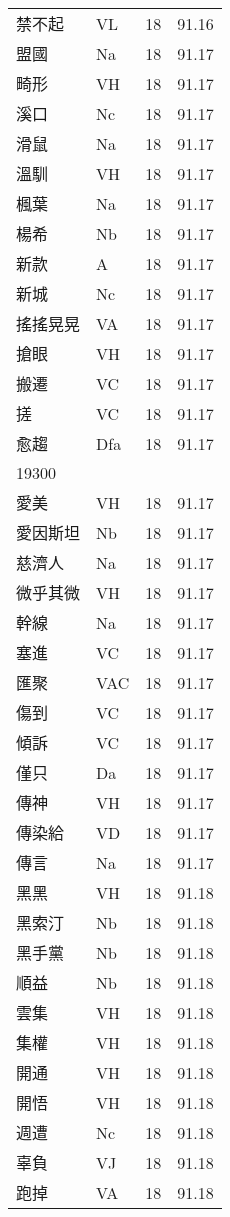 \documentclass[twocolumn]{book}
\begin{document}
\begin{supertabular}{llrr}
禁不起 & VL & 18 &  91.16\\
盟國 & Na & 18 &  91.17\\
畸形 & VH & 18 &  91.17\\
溪口 & Nc & 18 &  91.17\\
滑鼠 & Na & 18 &  91.17\\
溫馴 & VH & 18 &  91.17\\
楓葉 & Na & 18 &  91.17\\
楊希 & Nb & 18 &  91.17\\
新款 & A & 18 &  91.17\\
新城 & Nc & 18 &  91.17\\
搖搖晃晃 & VA & 18 &  91.17\\
搶眼 & VH & 18 &  91.17\\
搬遷 & VC & 18 &  91.17\\
搓 & VC & 18 &  91.17\\
愈趨 & Dfa & 18 &  91.17\\
19300\\
愛美 & VH & 18 &  91.17\\
愛因斯坦 & Nb & 18 &  91.17\\
慈濟人 & Na & 18 &  91.17\\
微乎其微 & VH & 18 &  91.17\\
幹線 & Na & 18 &  91.17\\
塞進 & VC & 18 &  91.17\\
匯聚 & VAC & 18 &  91.17\\
傷到 & VC & 18 &  91.17\\
傾訴 & VC & 18 &  91.17\\
僅只 & Da & 18 &  91.17\\
傳神 & VH & 18 &  91.17\\
傳染給 & VD & 18 &  91.17\\
傳言 & Na & 18 &  91.17\\
黑黑 & VH & 18 &  91.18\\
黑索汀 & Nb & 18 &  91.18\\
黑手黨 & Nb & 18 &  91.18\\
順益 & Nb & 18 &  91.18\\
雲集 & VH & 18 &  91.18\\
集權 & VH & 18 &  91.18\\
開通 & VH & 18 &  91.18\\
開悟 & VH & 18 &  91.18\\
週遭 & Nc & 18 &  91.18\\
辜負 & VJ & 18 &  91.18\\
跑掉 & VA & 18 &  91.18\\

\end{supertabular}
\end{document}
